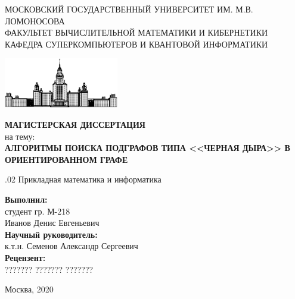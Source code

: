 \documentclass[12pt,a4paper,oneside,openany]{article}
\theoremstyle{definition}
\theoremstyle{lemma}
\theoremstyle{remark}
\begin{document}
\begin{titlepage}
        \begin{center}

        \bigskip

        \MakeTextUppercase{Московский государственный университет им. М.В. Ломоносова} \\

        \MakeTextUppercase{Факультет вычислительной математики и кибернетики} \\
        \MakeTextUppercase{Кафедра суперкомпьютеров и квантовой информатики} \\
        \bigskip

        \includegraphics[width=50mm]{msu.eps}

        \bigskip
        \bigskip
        \MakeTextUppercase{\textbf{\Huge Магистерская диссертация}} \\
        \bigskip
        {\large на тему:} \\
        \bigskip
        \MakeTextUppercase{\textbf{\large Алгоритмы поиска подграфов типа <<черная дыра>> в ориентированном графе}}

        .02 Прикладная математика и информатика

    \end{center}

    \bigskip
    \bigskip
    \bigskip
    \begin{flushright}
        \begin{minipage}{7cm}
            \textbf{Выполнил:} \\
            студент гр. М-218 \\
            Иванов Денис Евгеньевич \\

            \textbf{Научный руководитель:} \\
            к.т.н. Семенов Александр Сергеевич \\

            \textbf{Рецензент:} \\
            ??????? ??????? ???????
        \end{minipage}
    \end{flushright}

    \vfill

    \begin{center}
    {\large Москва, 2020}
    \end{center}

\end{titlepage}
\cleardoublepage
\end{document}

